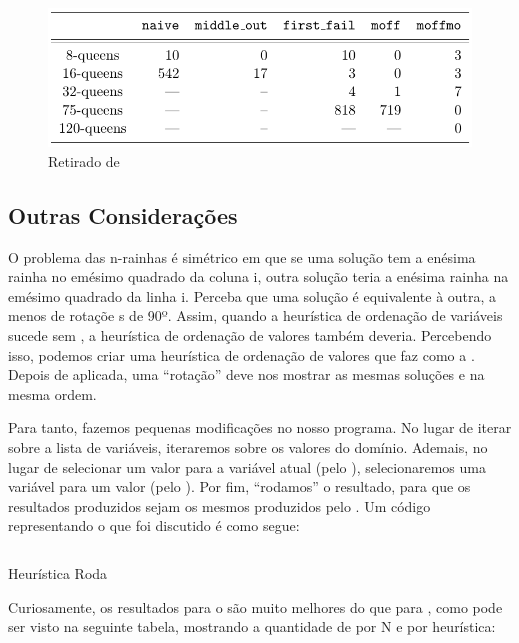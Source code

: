 \documentclass{article}
\begin{document}
\begin{figure}[h]
  \caption{Retirado de \cite{krzysztof}}\label{fig:psi}
  \centering
  \includegraphics[scale=0.5]{HeuristicsBacktrack.png}
\end{figure}

\subsection{Outras Considerações}

O problema das n-rainhas é simétrico em que se uma solução tem a enésima rainha no emésimo quadrado da
coluna i, outra solução teria a enésima rainha na emésimo quadrado da linha i. Perceba que uma solução é
equivalente à outra, a menos de rotaçõe s de 90º. Assim, quando a heurística de ordenação de
variáveis  sucede sem , a heurística de ordenação de
valores  também deveria. Percebendo isso, podemos criar uma heurística
de ordenação de valores que faz  como a . Depois de
aplicada, uma ``rotação'' deve nos mostrar as mesmas soluções e na mesma ordem.

Para tanto, fazemos pequenas modificações no nosso programa. No lugar de iterar sobre a lista de
variáveis, iteraremos sobre os valores do domínio. Ademais, no lugar de selecionar um valor para a
variável atual (pelo ), selecionaremos uma variável para um valor (pelo
). Por fim, ``rodamos'' o resultado, para que os resultados produzidos sejam os
mesmos produzidos pelo . Um código representando o que foi discutido é como
segue:

    \begin{listing}
\inputminted{prolog}{../Exemplos/Cap11/prog7_queensHeurRotate.ecl}
    \caption{Heurística Roda}
    \end{listing}

Curiosamente, os resultados para o  são muito melhores do que para
, como pode ser visto na seguinte tabela, mostrando a quantidade de
 por N e por heurística:
\end{document}
